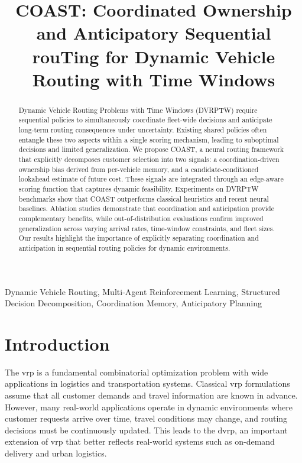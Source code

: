 \documentclass[conference]{IEEEtran}
\begin{document}
\title{COAST: Coordinated Ownership and Anticipatory Sequential rouTing for Dynamic Vehicle Routing with Time Windows}
\author{
}
	
\maketitle

\begin{abstract}
Dynamic Vehicle Routing Problems with Time Windows (DVRPTW) require sequential policies to simultaneously coordinate fleet-wide decisions and anticipate long-term routing consequences under uncertainty. Existing shared policies often entangle these two aspects within a single scoring mechanism, leading to suboptimal decisions and limited generalization. We propose COAST, a neural routing framework that explicitly decomposes customer selection into two signals: a coordination-driven ownership bias derived from per-vehicle memory, and a candidate-conditioned lookahead estimate of future cost. These signals are integrated through an edge-aware scoring function that captures dynamic feasibility. Experiments on DVRPTW benchmarks show that COAST outperforms classical heuristics and recent neural baselines. Ablation studies demonstrate that coordination and anticipation provide complementary benefits, while out-of-distribution evaluations confirm improved generalization across varying arrival rates, time-window constraints, and fleet sizes. Our results highlight the importance of explicitly separating coordination and anticipation in sequential routing policies for dynamic environments.
\end{abstract}

\begin{IEEEkeywords}
 Dynamic Vehicle Routing, Multi-Agent Reinforcement Learning, Structured Decision Decomposition, Coordination Memory, Anticipatory Planning
\end{IEEEkeywords}


\section{Introduction} \label{sec:intro}

The \gls{vrp} is a fundamental combinatorial optimization problem with wide applications in logistics and transportation systems. Classical \gls{vrp} formulations assume that all customer demands and travel information are known in advance. However, many real-world applications operate in dynamic environments where customer requests arrive over time, travel conditions may change, and routing decisions must be continuously updated. This leads to the \gls{dvrp}, an important extension of \gls{vrp} that better reflects real-world systems such as on-demand delivery and urban logistics.
\end{document}

